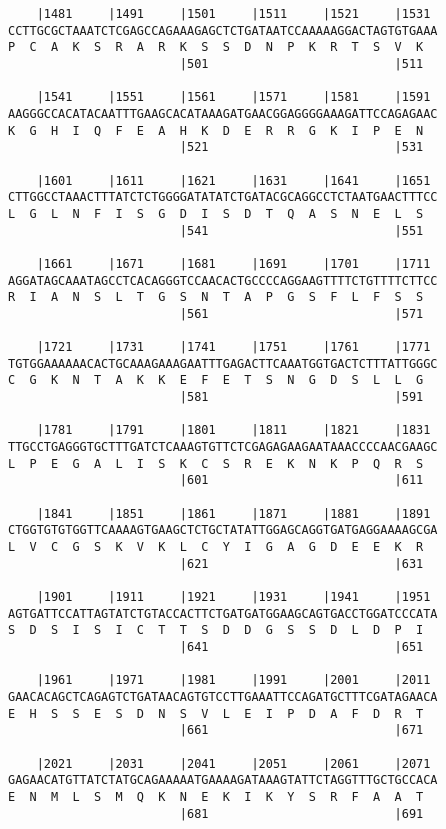 \documentclass{article}
\begin{document}
\begin{Verbatim}
    |1481     |1491     |1501     |1511     |1521     |1531 
CCTTGCGCTAAATCTCGAGCCAGAAAGAGCTCTGATAATCCAAAAAGGACTAGTGTGAAA
P  C  A  K  S  R  A  R  K  S  S  D  N  P  K  R  T  S  V  K  
                        |501                          |511  
  
    |1541     |1551     |1561     |1571     |1581     |1591 
AAGGGCCACATACAATTTGAAGCACATAAAGATGAACGGAGGGGAAAGATTCCAGAGAAC
K  G  H  I  Q  F  E  A  H  K  D  E  R  R  G  K  I  P  E  N  
                        |521                          |531  
  
    |1601     |1611     |1621     |1631     |1641     |1651 
CTTGGCCTAAACTTTATCTCTGGGGATATATCTGATACGCAGGCCTCTAATGAACTTTCC
L  G  L  N  F  I  S  G  D  I  S  D  T  Q  A  S  N  E  L  S  
                        |541                          |551  
  
    |1661     |1671     |1681     |1691     |1701     |1711 
AGGATAGCAAATAGCCTCACAGGGTCCAACACTGCCCCAGGAAGTTTTCTGTTTTCTTCC
R  I  A  N  S  L  T  G  S  N  T  A  P  G  S  F  L  F  S  S  
                        |561                          |571  
  
    |1721     |1731     |1741     |1751     |1761     |1771 
TGTGGAAAAAACACTGCAAAGAAAGAATTTGAGACTTCAAATGGTGACTCTTTATTGGGC
C  G  K  N  T  A  K  K  E  F  E  T  S  N  G  D  S  L  L  G  
                        |581                          |591  
  
    |1781     |1791     |1801     |1811     |1821     |1831 
TTGCCTGAGGGTGCTTTGATCTCAAAGTGTTCTCGAGAGAAGAATAAACCCCAACGAAGC
L  P  E  G  A  L  I  S  K  C  S  R  E  K  N  K  P  Q  R  S  
                        |601                          |611  
  
    |1841     |1851     |1861     |1871     |1881     |1891 
CTGGTGTGTGGTTCAAAAGTGAAGCTCTGCTATATTGGAGCAGGTGATGAGGAAAAGCGA
L  V  C  G  S  K  V  K  L  C  Y  I  G  A  G  D  E  E  K  R  
                        |621                          |631  
  
    |1901     |1911     |1921     |1931     |1941     |1951 
AGTGATTCCATTAGTATCTGTACCACTTCTGATGATGGAAGCAGTGACCTGGATCCCATA
S  D  S  I  S  I  C  T  T  S  D  D  G  S  S  D  L  D  P  I  
                        |641                          |651  
  
    |1961     |1971     |1981     |1991     |2001     |2011 
GAACACAGCTCAGAGTCTGATAACAGTGTCCTTGAAATTCCAGATGCTTTCGATAGAACA
E  H  S  S  E  S  D  N  S  V  L  E  I  P  D  A  F  D  R  T  
                        |661                          |671  
  
    |2021     |2031     |2041     |2051     |2061     |2071 
GAGAACATGTTATCTATGCAGAAAAATGAAAAGATAAAGTATTCTAGGTTTGCTGCCACA
E  N  M  L  S  M  Q  K  N  E  K  I  K  Y  S  R  F  A  A  T  
                        |681                          |691  
  

\end{Verbatim}
\end{document}
